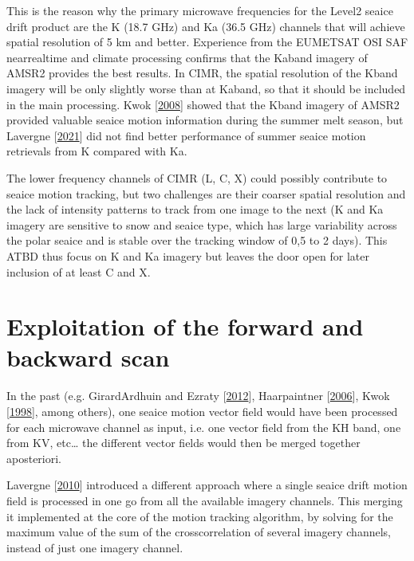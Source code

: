 \documentclass[letterpaper,10pt,english]{jupyterBook}
\begin{document}
\sphinxAtStartPar
This is the reason why the primary microwave frequencies for the Level\sphinxhyphen{}2 sea\sphinxhyphen{}ice drift product are the K (18.7 GHz) and Ka (36.5 GHz) channels
that will achieve spatial resolution of 5 km and better. Experience from the EUMETSAT OSI SAF near\sphinxhyphen{}real\sphinxhyphen{}time and climate processing confirms that
the Ka\sphinxhyphen{}band imagery of AMSR2 provides the best results. In CIMR, the spatial resolution of the K\sphinxhyphen{}band imagery will be only slightly worse than at
Ka\sphinxhyphen{}band, so that it should be included in the main processing. Kwok {[}\hyperlink{cite.references:id15}{2008}{]} showed that the K\sphinxhyphen{}band imagery of AMSR2 provided
valuable sea\sphinxhyphen{}ice motion information during the summer melt season, but Lavergne  {[}\hyperlink{cite.references:id20}{2021}{]} did not find better performance of summer
sea\sphinxhyphen{}ice motion retrievals from K compared with Ka.

\sphinxAtStartPar
The lower frequency channels of CIMR (L, C, X) could possibly contribute to sea\sphinxhyphen{}ice motion tracking, but two challenges are their coarser spatial
resolution and the lack of intensity patterns to track from one image to the next (K and Ka imagery are sensitive to snow and sea\sphinxhyphen{}ice type, which has
large variability across the polar sea\sphinxhyphen{}ice and is stable over the tracking window of 0,5 to 2 days). This ATBD thus focus on K and Ka imagery but leaves
the door open for later inclusion of at least C and X.


\section{Exploitation of the forward and backward scan}
\label{\detokenize{background_justification_algorithm:exploitation-of-the-forward-and-backward-scan}}
\sphinxAtStartPar
In the past (e.g. Girard\sphinxhyphen{}Ardhuin and Ezraty {[}\hyperlink{cite.references:id7}{2012}{]}, Haarpaintner {[}\hyperlink{cite.references:id9}{2006}{]}, Kwok  {[}\hyperlink{cite.references:id14}{1998}{]}, among others), one sea\sphinxhyphen{}ice motion vector field would have been processed
for each microwave channel as input, i.e. one vector field from the K\sphinxhyphen{}H band, one from K\sphinxhyphen{}V, etc… the different vector fields would then be merged together a\sphinxhyphen{}posteriori.

\sphinxAtStartPar
Lavergne  {[}\hyperlink{cite.references:id19}{2010}{]} introduced a different approach where a single sea\sphinxhyphen{}ice drift motion field is processed in one go from all the available imagery channels. This  merging
it implemented at the core of the motion tracking algorithm, by solving for the maximum value of the sum of the cross\sphinxhyphen{}correlation of several imagery channels, instead of just one imagery channel.
\end{document}

